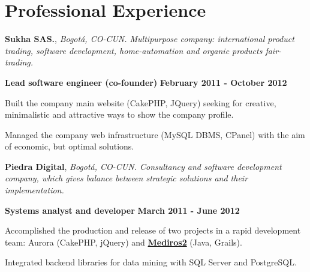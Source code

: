 \section{Professional Experience}
%
\textbf{Sukha SAS.}, \textit{Bogot\'a, CO-CUN.
Multipurpose company:
international product trading, software development, home-automation and organic
products fair-trading.}

\begin{outerlist}
\item[\FA \faAngleDoubleRight] \textbf{Lead software engineer (co-founder)}
\hfill \textbf{February 2011 - October 2012}
\end{outerlist}

    \begin{innerlist}
\item Built the company main website (CakePHP, JQuery) seeking for creative,
minimalistic and attractive ways to show the company profile.
\item Managed the company web infrastructure (MySQL DBMS, CPanel) with the
aim of economic, but optimal solutions.
    \end{innerlist}

\quarterblankline

\textbf{Piedra Digital},
\textit{Bogot\'a, CO-CUN. Consultancy and software development
company, which gives balance between strategic solutions and their implementation.}

\begin{outerlist}
\item[\FA \faAngleDoubleRight] \textbf{Systems analyst and developer} \hfill
\textbf{March 2011 - June 2012}
\end{outerlist}

    \begin{innerlist}
\item Accomplished the production and release of
two projects in a rapid development team: Aurora (CakePHP, jQuery) and
\href{http://demo.100grados.co:8080/desempeno100/}{\textbf{Mediros2}} (Java,
Grails).
\item Integrated backend libraries for data mining with SQL Server and
PostgreSQL.
    \end{innerlist}

\quarterblankline



